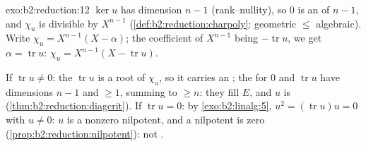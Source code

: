 \begin{solution}{exo:b2:reduction:12}
$\ker u$ has dimension $n - 1$ (rank--nullity), so $0$ is an
 of  $n - 1$, and $\chi_u$ is
divisible by $X^{n-1}$
(\cref{def:b2:reduction:charpoly}: geometric $\leq$ algebraic).
Write $\chi_u = X^{n-1}(X - \alpha)$; the coefficient of
$X^{n-1}$ being $-\operatorname{tr} u$, we get $\alpha =
\operatorname{tr} u$: $\chi_u = X^{n-1}(X - \operatorname{tr}
u)$.

If $\operatorname{tr} u \neq 0$: the 
$\operatorname{tr} u$ is a root of $\chi_u$, so it carries an
; the  for $0$ and $\operatorname{tr} u$
have dimensions $n - 1$ and $\geq 1$, summing to $\geq n$: they
fill $E$, and $u$ is 
(\cref{thm:b2:reduction:diagcrit}). If $\operatorname{tr} u = 0$:
by \cref{exo:b2:linalg:5}, $u^2 = (\operatorname{tr} u)u = 0$
with $u \neq 0$: $u$ is a nonzero nilpotent, and a 
nilpotent is zero (\cref{prop:b2:reduction:nilpotent}): not
.
\end{solution}


